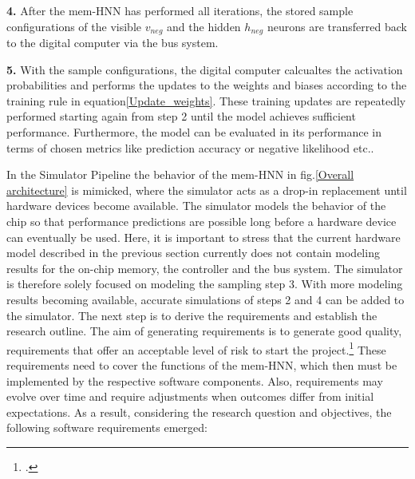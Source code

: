 \textbf{4.} After the \ac{mem-HNN} has performed all iterations, the stored sample configurations
of the visible \(v_{neg}\) and the hidden \(h_{neg}\) neurons are transferred back to the digital computer via the bus system.

\textbf{5.} With the sample configurations, the digital computer calcualtes the activation probabilities and performs
the updates to the weights and biases according to the training rule in equation\ref{Update_weights}.
These training updates are repeatedly performed starting again from step 2 until the model achieves sufficient performance.
Furthermore, the model can be evaluated in its performance in terms of chosen metrics like prediction accuracy or negative likelihood etc..

In the Simulator Pipeline the behavior of the \ac{mem-HNN} in fig.\ref{Overall architecture} is mimicked, where the simulator acts as a drop-in replacement until hardware devices become available.
The simulator models the behavior of the chip so that performance predictions are possible long before a hardware device can eventually be used.
Here, it is important to stress that the current hardware model described in the previous section currently does not contain modeling results for the on-chip memory, the controller and the bus system.
The simulator is therefore solely focused on modeling the sampling step 3.
With more modeling results becoming available, accurate simulations of steps 2 and 4 can be added to the simulator.
The next step is to derive the requirements and establish the research outline.
The aim of generating requirements is to generate good quality, requirements that offer an acceptable level of risk to start the project.\footcite[cf.][11]{ebertSystematischesRequirementsEngineering2008}
These requirements need to cover the functions of the \ac{mem-HNN}, which then must be implemented by the respective software components.
Also, requirements may evolve over time and require adjustments when outcomes differ from initial expectations.
As a result, considering the research question and objectives, the following software requirements emerged:

